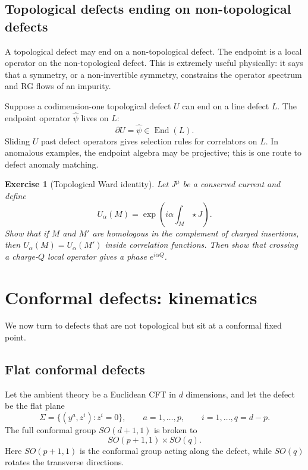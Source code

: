 \documentclass[11pt]{article}
\newtheorem{exercise}[theorem]{Exercise}
\begin{document}
\subsection{Topological defects ending on non-topological defects}

A topological defect may end on a non-topological defect.  The endpoint is a local operator on the non-topological defect.  This is extremely useful physically: it says that a symmetry, or a non-invertible symmetry, constrains the operator spectrum and RG flows of an impurity.

Suppose a codimension-one topological defect $U$ can end on a line defect $L$.  The endpoint operator $\widehat\psi$ lives on $L$:
\begin{equation}
  \partial U=\widehat\psi\in\operatorname{End}(L) .
\end{equation}
Sliding $U$ past defect operators gives selection rules for correlators on $L$.  In anomalous examples, the endpoint algebra may be projective; this is one route to defect anomaly matching.

\begin{exercise}[Topological Ward identity]
Let $J^\mu$ be a conserved current and define
\begin{equation}
  U_\alpha(M)=\exp\left(i\alpha\int_M\star J\right) .
\end{equation}
Show that if $M$ and $M'$ are homologous in the complement of charged
insertions, then $U_\alpha(M)=U_\alpha(M')$ inside correlation functions.
Then show that crossing a charge-$Q$ local operator gives a phase
$e^{i\alpha Q}$.
\end{exercise}

\section{Conformal defects: kinematics}

We now turn to defects that are not topological but sit at a conformal fixed point.

\subsection{Flat conformal defects}

Let the ambient theory be a Euclidean CFT in $d$ dimensions, and let the defect be the flat plane
\begin{equation}
  \Sigma=\{(y^a,z^i): z^i=0\},
  \qquad a=1,\dots,p,
  \qquad i=1,
  \dots,q=d-p .
\end{equation}
The full conformal group $SO(d+1,1)$ is broken to
\begin{equation}
  SO(p+1,1)\times SO(q) .
\end{equation}
Here $SO(p+1,1)$ is the conformal group acting along the defect, while $SO(q)$ rotates the transverse directions.
\end{document}
